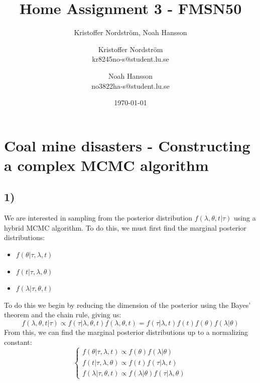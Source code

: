 \documentclass[a4paper]{article}
\title{Home Assignment 3 - FMSN50}
\author{Kristoffer Nordström, Noah Hansson}\author{Kristoffer Nordström \\ kr8245no-s@student.lu.se \and  Noah Hansson \\ no3822ha-s@student.lu.se}
\date{\today}
\begin{document}
\maketitle
\newpage

\section*{Coal mine disasters - Constructing a complex MCMC algorithm}


\subsection*{1)}
We are interested in sampling from the posterior distribution $f(\lambda, \theta, t | \tau)$ using a hybrid MCMC algorithm. To do this, we must first find the marginal posterior distributions:
\begin{itemize}
    \item $f(\theta | \tau, \lambda, t)$
    \item $f(t | \tau, \lambda, \theta)$
    \item $f(\lambda | \tau, \theta, t)$
\end{itemize}

To do this we begin by reducing the dimension of the posterior using the Bayes' theorem and the chain rule, giving us:
\begin{equation}
    f(\lambda, \theta, t | \tau) \propto f(\tau|\lambda, \theta, t)f(\lambda, \theta,t) = f(\tau|\lambda,t)f(t)f(\theta)f(\lambda|\theta)
\end{equation}
From this, we can find the marginal posterior distributions up to a normalizing constant:
\begin{equation}
    \begin{cases}
        f(\theta | \tau, \lambda, t) \propto f(\theta)f(\lambda|\theta) \\
        f(t | \tau, \lambda, \theta) \propto f(t)f(\tau|\lambda,t) \\
        f(\lambda | \tau, \theta, t) \propto f(\lambda|\theta)f(\tau|\lambda,\theta)
    \end{cases}
\end{equation}
\end{document}

